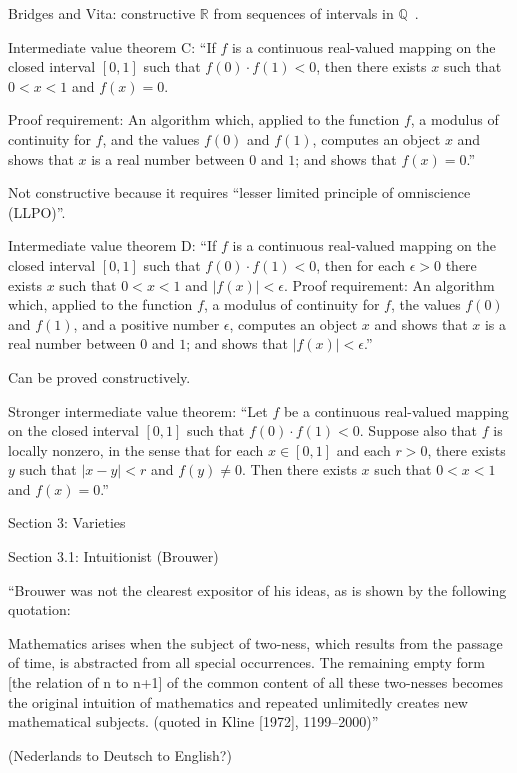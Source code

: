 Bridges and Vita: constructive $\mathbb{R}$ from sequences
of intervals in $\mathbb{Q}$~\cite{Bridger:2019}.

Intermediate value theorem C: 
``If $f$ is a continuous real-valued mapping 
on the closed interval $[0,1]$ such that $f(0)⋅f(1)<0$, 
then there exists $x$ such that $0<x<1$ and $f(x)=0$.

Proof requirement: 
An algorithm which, applied to the function $f$, 
a modulus of continuity for $f$, and the values $f(0)$ and $f(1)$,
computes an object $x$ and shows that $x$ is a real number 
between $0$ and $1$; and
shows that $f(x)=0$.''~\cite{sep:mathematics_constructive}

Not constructive because it requires
``lesser limited principle of omniscience (LLPO)''.

Intermediate value theorem D:
``If $f$ is a continuous real-valued mapping 
on the closed interval $[0,1]$ 
such that $f(0)⋅f(1)<0$, 
then for each $\epsilon>0$ 
there exists $x$ such that $0<x<1$ and $|f(x)|<\epsilon$.
Proof requirement: 
An algorithm which, applied to the function $f$, 
a modulus of continuity for $f$, the values $f(0)$ and $f(1)$, 
and a positive number $\epsilon$,
computes an object $x$ 
and shows that $x$ is a real number between $0$ and $1$; and
shows that $|f(x)|<\epsilon$.''~\cite{sep:mathematics_constructive}

Can be proved constructively.

Stronger intermediate value theorem:
``Let $f$ be a continuous real-valued mapping 
on the closed interval $[0,1]$ 
such that $f(0)⋅f(1)<0$. 
Suppose also that $f$ is locally nonzero, 
in the sense that for each $x \in [0,1]$
and each $r>0$, 
there exists $y$ such that $|x−y|<r$ and $f(y) \neq 0$. 
Then there exists $x$ such that $0<x<1$ and $f(x)=0$.''

Section 3: Varieties

Section 3.1: Intuitionist (Brouwer)

``Brouwer was not the clearest expositor of his ideas, 
as is shown by the following quotation:

Mathematics arises when the subject of two-ness, 
which results from the passage of time, 
is abstracted from all special occurrences. 
The remaining empty form [the relation of n to n+1] 
of the common content of all these two-nesses 
becomes the original intuition of mathematics 
and repeated unlimitedly creates new mathematical subjects. 
(quoted in Kline [1972], 1199–2000)''

(Nederlands to Deutsch to English?)

